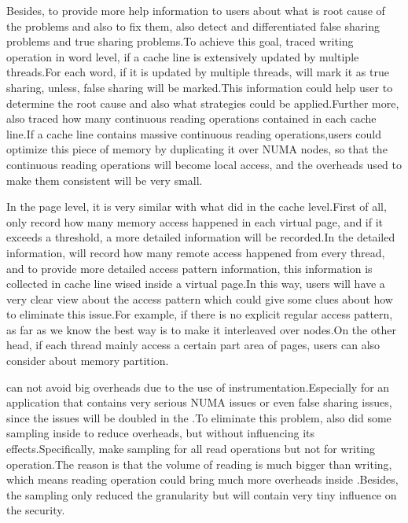 Besides, to provide more help information to users about what is root cause of the problems and also to fix them, \NP{} also detect and differentiated false sharing problems and true sharing problems.To achieve this goal, \NP{} traced writing operation in word level, if a cache line is extensively updated by multiple threads.For each word, if it is updated by multiple threads, \NP{} will mark it as true sharing, unless, false sharing will be marked.This information could help user to determine the root cause and also what strategies could be applied.Further more, \NP{} also traced how many continuous reading operations contained in each cache line.If a cache line contains massive continuous reading operations,users could optimize this piece of memory by duplicating it over NUMA nodes, so that the continuous reading operations will become local access, and the overheads used to make them consistent will be very small.

In the page level, it is very similar with what \NP{} did in the cache level.First of all, \NP{} only record how many memory access happened in each virtual page, and if it exceeds a threshold, a more detailed information will be recorded.In the detailed information, \NP{} will record how many remote access happened from every thread, and to provide more detailed access pattern information, this information is collected in cache line wised inside a virtual page.In this way, users will have a very clear view about the access pattern which could give some clues about how to eliminate this issue.For example, if there is no explicit regular access pattern, as far as we know the best way is to make it interleaved over nodes.On the other head, if each thread mainly access a certain part area of pages, users can also consider about memory partition.

\NP{} can not avoid big overheads due to the use of instrumentation.Especially for an application that contains very serious NUMA issues or even false sharing issues, since the issues will be doubled in the \NP{}.To eliminate this problem, \NP{} also did some sampling inside to reduce overheads, but without influencing its effects.Specifically, \NP{} make sampling for all read operations but not for writing operation.The reason is that the volume of reading is much bigger than writing, which means reading operation could bring much more overheads inside \NP{}.Besides, the sampling only reduced the granularity but will contain very tiny influence on the security.


